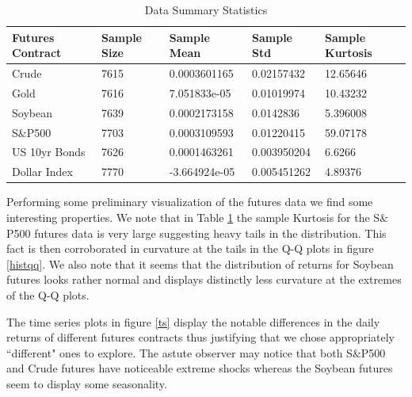 \documentclass[11pt,]{article}
\begin{document}
\begin{table}[ht]
\begin{tabular}{ |p{3cm}||p{2cm}|p{2.3cm}|p{2cm}|p{2.8cm}|}
 \hline
 Futures Contract & Sample Size & Sample Mean & Sample Std & Sample Kurtosis\\
 \hline
 Crude & 7615 & 0.0003601165 & 0.02157432 & 12.65646\\
 Gold & 7616 & 7.051833e-05 & 0.01019974 & 10.43232\\
 Soybean & 7639 & 0.0002173158 & 0.0142836 & 5.396008 \\
 S$\&$P500 & 7703 & 0.0003109593 & 0.01220415 & 59.07178  \\
 US 10yr Bonds & 7626 & 0.0001463261 & 0.003950204 & 6.6266 \\
 Dollar Index & 7770 & -3.664924e-05 & 0.005451262 & 4.89376 \\
 \hline
\end{tabular}
\caption{\label{summary} Data Summary Statistics}
\end{table}

Performing some preliminary visualization of the futures data we find some interesting properties. We note that in Table \ref{summary} the sample Kurtosis for the S$\&$P500 futures data is very large suggesting heavy tails in the distribution. This fact is then corroborated in curvature at the tails in the Q-Q plots in figure \ref{histqq}. We also note that it seems that the distribution of returns for Soybean futures looks rather normal and displays distinctly less curvature at the extremes of the Q-Q plots.

The time series plots in figure \ref{ts} display the notable differences in the daily returns of different futures contracts thus justifying that we chose appropriately ``different" ones to explore. The astute observer may notice that both S$\&$P500 and Crude futures have noticeable extreme shocks whereas the Soybean futures seem to display some seasonality.  
\end{document}
